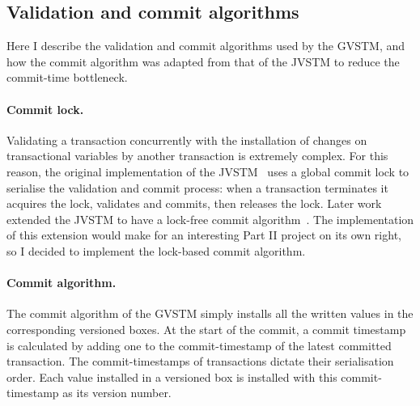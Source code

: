 \documentclass[12pt,a4paper,oneside,openright]{report}
\newcommand{\goFunc}[1]{\texttt{#1}}
\begin{document}

\subsection{Validation and commit algorithms}
\label{sec:valid-comm-algor}

Here I describe the validation and commit algorithms used by the
GVSTM, and how the commit algorithm was adapted from that of the JVSTM
to reduce the commit-time bottleneck.

\paragraph{Commit lock.} Validating a transaction concurrently with
the installation of changes on transactional variables by another
transaction is extremely complex. For this reason, the original
implementation of the JVSTM~\cite{VBox} uses a global commit lock to
serialise the validation and commit process: when a transaction
terminates it acquires the lock, validates and commits, then releases
the lock. Later work extended the JVSTM to have a lock-free commit
algorithm~\cite{fernandes2011lock}. The implementation of this
extension would make for an interesting Part II project on its own
right, so I decided to implement the lock-based commit algorithm.

\paragraph{Commit algorithm.} The commit algorithm of the GVSTM simply
installs all the written values in the corresponding versioned
boxes. At the start of the commit, a commit timestamp is calculated by
adding one to the commit-timestamp of the latest committed
transaction. The commit-timestamps of transactions dictate their
serialisation order. Each value installed in a versioned box is
installed with this commit-timestamp as its version number.
\end{document}
